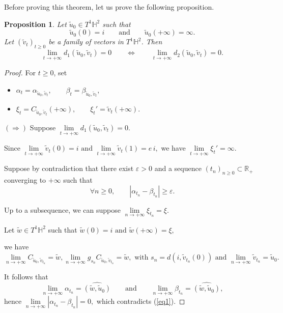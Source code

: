 \documentclass[a4paper,english,reqno]{amsart}
\newtheorem{proposition}{Proposition}
\theoremstyle{definition}
\numberwithin{equation}{section}
\begin{document}
Before proving this theorem, let us prove the following proposition.

\begin{proposition}\label{prop4}
	Let $\tilde u_{0}\in T^{1}\mathbb H^{2}$ such that
	\[
	\tilde u_{0}(0)=i
	\qquad\text{and}\qquad
	\tilde u_{0}(+\infty)=\infty.
	\]
	Let $(\tilde v_{t})_{t\geq 0}$ be a family of vectors in $T^{1}\mathbb H^{2}$.
	Then
	\[
	\lim\limits_{t\to+\infty} d_{1}(\tilde u_{0},\tilde v_{t})=0
	\qquad\Longleftrightarrow\qquad
	\lim\limits_{t\to+\infty} d_{2}(\tilde u_{0},\tilde v_{t})=0.
	\]
\end{proposition}

\begin{proof}

For $t\geq 0$, set
\begin{itemize}
	
	\item$ \alpha_{t}=\alpha_{\tilde u_{0},\tilde v_{t}},
	\qquad
	\beta_{t}=\beta_{\tilde u_{0},\tilde v_{t}},
	$
	\item $\xi_{t}=C_{\tilde u_{0},\tilde v_{t}}(+\infty),
	\qquad
	\xi_{t}'=\tilde v_{t}(+\infty).
	$
\end{itemize}
\medskip

\noindent
$\left( \Longrightarrow \right)$ Suppose $
\lim\limits_{t\to+\infty} d_{1}(\tilde u_{0},\tilde v_{t})=0.
$

Since $
\lim\limits_{t\to+\infty}\tilde v_{t}(0)=i
\text{ and }
\lim\limits_{t\to+\infty}\tilde v_{t}(1)=e\,i,
$
we have $
\lim\limits_{t\to+\infty}\xi_{t}'=\infty.
$

Suppose by contradiction that there exist $\varepsilon>0$ and a sequence $(t_{n})_{n\geq 0}\subset\mathbb R_{+}$
converging to $+\infty$ such that
\begin{equation}\label{eq1}
	\forall n\geq 0,\qquad |\alpha_{t_{n}}-\beta_{t_{n}}|\geq \varepsilon.
\end{equation}

Up to a subsequence, we can suppose $
\lim\limits_{n\to+\infty}\xi_{t_{n}}=\xi.
$

Let $\tilde w\in T^{1}\mathbb H^{2}$ such that
$
\tilde w(0)=i
\text{ and }
\tilde w(+\infty)=\xi,
$

we have
$
\lim\limits_{n\to+\infty} C_{\tilde u_{0},\tilde v_{t_{n}}}=\tilde w,
\lim\limits_{n\to+\infty}g_{s_n}C_{\tilde u_0,\tilde v_{t_n}}=\tilde w, \text{ with } s_n=d(i,\tilde v_{t_n}(0))
\text{ and }
\lim\limits_{n\to+\infty}\tilde v_{t_{n}}=\tilde u_{0}.
$

It follows that
\[
\lim\limits_{n\to+\infty}\alpha_{t_{n}}=\widehat{(\tilde w,\tilde u_{0})}
\qquad\text{and}\qquad
\lim\limits_{n\to+\infty}\beta_{t_{n}}=\widehat{(\tilde w,\tilde u_{0})},
\]
hence
$
\lim\limits_{n\to+\infty}|\alpha_{t_{n}}-\beta_{t_{n}}|=0,
$
which contradicts (\ref{eq1}).


\end{proof}
\end{document}
